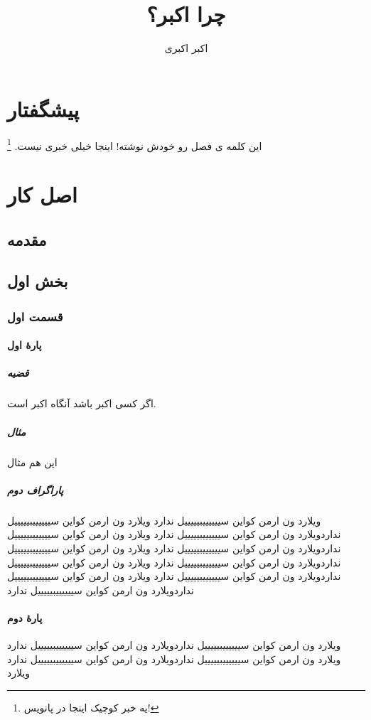 \documentclass{book}
\author{اکبر اکبری}
\title{چرا اکبر؟}
\begin{document}
	\maketitle
 	\tableofcontents
 	\chapter{پیشگفتار}
 	\label{key}
 	این کلمه ی فصل رو خودش نوشته! اینجا خیلی خبری نیست. \footnote{یه خبر کوچیک اینجا در پانویس!}
 	\chapter{اصل کار}
 	\section{مقدمه}
	\section{بخش اول}
	\subsection{قسمت اول}
	\subsubsection[تو فهرست اینو نشون بده نه اصلی رو]{پارهٔ اول}
	\paragraph{قضیه}
	اگر کسی اکبر باشد آنگاه اکبر است.
	\paragraph{مثال}
	این هم مثال
	
	\paragraph{پاراگراف دوم}
	ویلارد ون ارمن کواین سییییییبیییییل ندارد ویلارد ون ارمن کواین سییییییبیییییل نداردویلارد ون ارمن کواین سییییییبیییییل ندارد ویلارد ون ارمن کواین سییییییبیییییل نداردویلارد ون ارمن کواین سییییییبیییییل ندارد ویلارد ون ارمن کواین سییییییبیییییل نداردویلارد ون ارمن کواین سییییییبیییییل ندارد ویلارد ون ارمن کواین سییییییبیییییل نداردویلارد ون ارمن کواین سییییییبیییییل ندارد ویلارد ون ارمن کواین سییییییبیییییل نداردویلارد ون ارمن کواین سییییییبیییییل ندارد
	\subsubsection*{پارهٔ دوم}
	 ویلارد ون ارمن کواین سییییییبیییییل نداردویلارد ون ارمن کواین سییییییبیییییل ندارد ویلارد ون ارمن کواین سییییییبیییییل نداردویلارد ون ارمن کواین سییییییبیییییل ندارد ویلارد 
\end{document}

